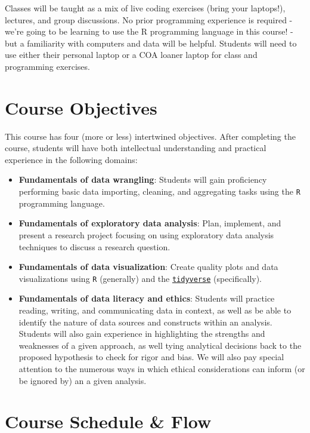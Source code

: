 \documentclass[
]{book}
\providecommand{\tightlist}{%
  \setlength{\itemsep}{0pt}\setlength{\parskip}{0pt}}
\begin{document}
Classes will be taught as a mix of live coding exercises (bring your laptops!), lectures, and group discussions. No prior programming experience is required - we're going to be learning to use the R programming language in this course! - but a familiarity with computers and data will be helpful. Students will need to use either their personal laptop or a COA loaner laptop for class and programming exercises.

\hypertarget{course-objectives}{%
\section*{Course Objectives}\label{course-objectives}}

This course has four (more or less) intertwined objectives. After completing the course, students will have both intellectual understanding and practical experience in the following domains:

\begin{itemize}
\tightlist
\item
  \textbf{Fundamentals of data wrangling}: Students will gain proficiency performing basic data importing, cleaning, and aggregating tasks using the \texttt{R} programming language.
\item
  \textbf{Fundamentals of exploratory data analysis}: Plan, implement, and present a research project focusing on using exploratory data analysis techniques to discuss a research question.
\item
  \textbf{Fundamentals of data visualization}: Create quality plots and data visualizations using \texttt{R} (generally) and the \href{https://www.tidyverse.org/}{\texttt{tidyverse}} (specifically).
\item
  \textbf{Fundamentals of data literacy and ethics}: Students will practice reading, writing, and communicating data in context, as well as be able to identify the nature of data sources and constructs within an analysis. Students will also gain experience in highlighting the strengths and weaknesses of a given approach, as well tying analytical decisions back to the proposed hypothesis to check for rigor and bias. We will also pay special attention to the numerous ways in which ethical considerations can inform (or be ignored by) an a given analysis.
\end{itemize}

\hypertarget{course-schedule-flow}{%
\section*{Course Schedule \& Flow}\label{course-schedule-flow}}
\end{document}
